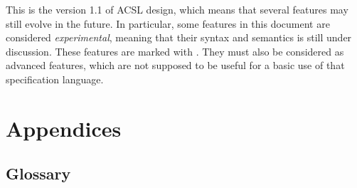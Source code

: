 \documentclass[a4paper,11pt,twoside,openright]{report}
\begin{document}
This is the version 1.1 of ACSL design, which means that several
features may still evolve in the future. In particular, some features
in this document are considered \emph{experimental}, meaning that
their syntax and semantics is still under discussion.  These features
are marked with \experimental.
They must also be considered as advanced features, which are not
supposed to be useful for a basic use of that specification language.









\appendix

\chapter{Appendices}
\label{chap:appendix}



\section{Glossary}
\label{sec:glossary}
\end{document}
